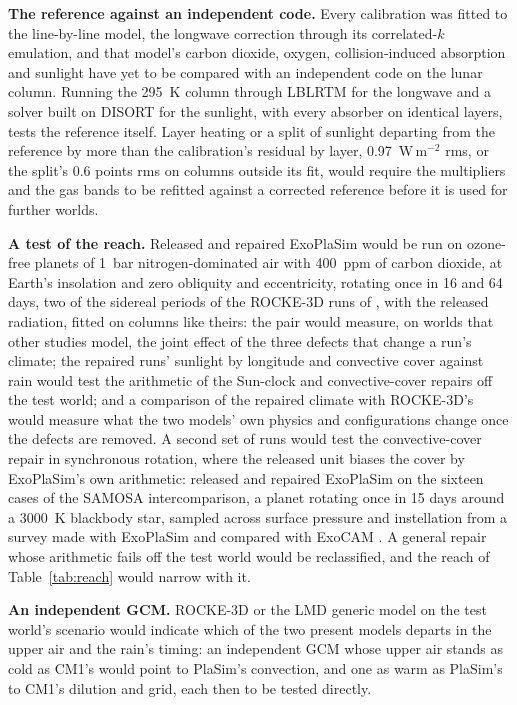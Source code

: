 \textbf{The reference against an independent code.} Every calibration was fitted to the line-by-line model, the
longwave correction through its correlated-$k$ emulation, and that model's carbon dioxide, oxygen,
collision-induced absorption and sunlight have yet to be compared with an independent code on the lunar column. Running the 295~K column through LBLRTM \autocite{clough2005atmospheric} for the
longwave and a solver built on DISORT \autocite{stamnes1988numerically} for the sunlight, with every absorber on
identical layers, tests the reference itself. Layer heating or a split of sunlight departing from the reference by
more than the calibration's residual by layer, 0.97~W\,m$^{-2}$ rms, or the split's 0.6 points rms on columns
outside its fit, would require the
multipliers and the gas bands to be refitted against a corrected reference before it is used for further worlds.

\textbf{A test of the reach.} Released and repaired ExoPlaSim would be run on ozone-free planets of 1~bar
nitrogen-dominated air with 400~ppm of carbon dioxide, at Earth's insolation and zero obliquity and eccentricity, rotating once in 16 and 64 days, two of
the sidereal periods of the ROCKE-3D runs of \textcite{way2018climates}, with the released radiation, fitted on
columns like theirs: the pair would measure, on worlds that other studies model, the joint effect of the three
defects that change a run's climate; the
repaired runs' sunlight by longitude and convective cover against rain would test the arithmetic of the Sun-clock
and convective-cover repairs off the test world; and a comparison of the repaired climate with ROCKE-3D's would
measure what the two models' own physics and configurations change once the defects are removed. A second set
of runs would test the convective-cover repair in synchronous rotation, where the released unit biases the cover by
ExoPlaSim's own arithmetic: released and repaired ExoPlaSim on the sixteen cases of the SAMOSA intercomparison, a
planet rotating once in 15 days around a 3000~K blackbody star, sampled across surface pressure and instellation
from a survey made with ExoPlaSim and compared with ExoCAM \autocite{haqqmisra2022samosa}. A general repair
whose arithmetic fails off the test world would be reclassified, and the reach of Table~\ref{tab:reach} would
narrow with it.

\textbf{An independent GCM.} ROCKE-3D or the LMD generic model on the test world's scenario
\autocite{way2017resolving,wordsworth2011gliese} would indicate which of the two present models departs in the
upper air and the rain's timing: an independent GCM whose upper air stands as cold as CM1's would point to PlaSim's
convection, and one as warm as PlaSim's to CM1's dilution and grid, each then to be tested directly.

